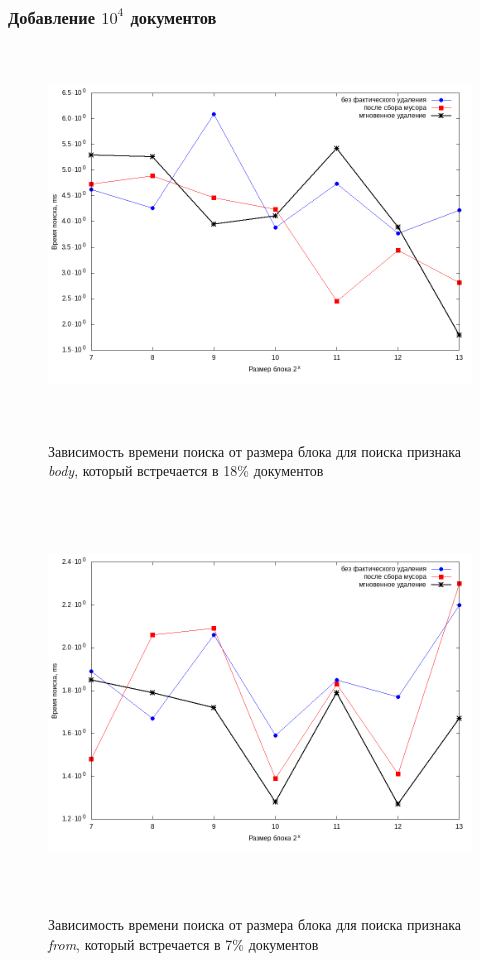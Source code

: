 \subsubsection{Добавление $10^4$ документов}

\begin{figure}[H]
\includegraphics[width=\linewidth, height=10cm]{fig/limit_1e6/1e4/body.png}
\caption{Зависимость времени поиска от размера блока для поиска признака \textit{body}, который встречается в 18\% документов}
\includegraphics[width=\linewidth, height=11cm]{fig/limit_1e6/1e4/from.png}
\caption{Зависимость времени поиска от размера блока для поиска признака \textit{from}, который встречается в 7\% документов}
\end{figure}

